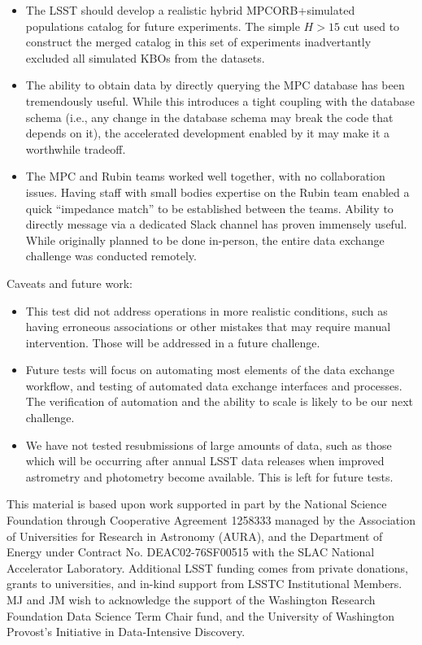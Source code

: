 \begin{itemize}
	\item The LSST should develop a realistic hybrid MPCORB+simulated populations catalog for future experiments. The simple $H > 15$ cut used to construct the merged catalog in this set of experiments inadvertantly excluded all simulated KBOs from the datasets.
	\item The ability to obtain data by directly querying the MPC database has been tremendously useful. While this introduces a tight coupling with the database schema (i.e., any change in the database schema may break the code that depends on it), the accelerated development enabled by it may make it a worthwhile tradeoff.
	\item The MPC and Rubin teams worked well together, with no collaboration issues. Having staff with small bodies expertise on the Rubin team enabled a quick ``impedance match'' to be established between the teams. Ability to directly message via a dedicated Slack channel has proven immensely useful. While originally planned to be done in-person, the entire data exchange challenge was conducted remotely.
\end{itemize}

Caveats and future work:
\begin{itemize}
	\item This test did not address operations in more realistic conditions, such as having erroneous associations or other mistakes that may require manual intervention. Those will be addressed in a future challenge.
	\item Future tests will focus on automating most elements of the data exchange workflow, and testing of automated data exchange interfaces and processes. The verification of automation and the ability to scale is likely to be our next challenge.
	\item We have not tested resubmissions of large amounts of data, such as those which will be occurring after annual LSST data releases when improved astrometry and photometry become available. This is left for future tests.
\end{itemize}

\acknowledgements

This material is based upon work supported in part by the National Science Foundation through Cooperative Agreement 1258333 managed by the Association of Universities for Research in Astronomy (AURA), and the Department of Energy under Contract No. DEAC02-76SF00515 with the SLAC National Accelerator Laboratory. Additional LSST funding comes from private donations, grants to universities, and in-kind support from LSSTC Institutional Members. MJ and JM wish to acknowledge the support of the Washington Research Foundation Data Science Term Chair fund, and the University of Washington Provost’s Initiative in Data-Intensive Discovery.

